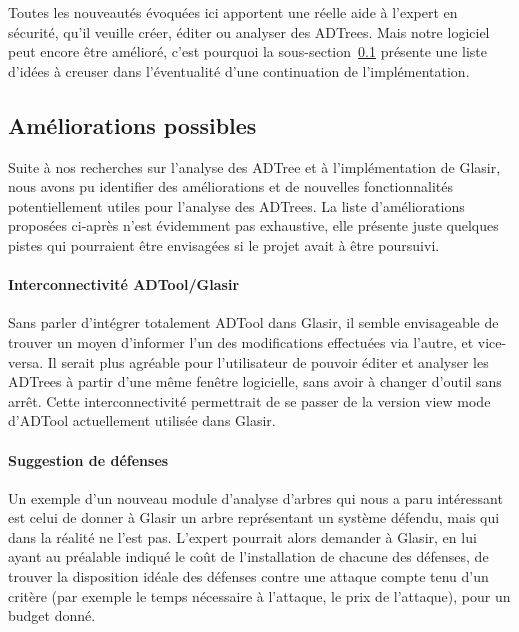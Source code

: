 Toutes les nouveautés évoquées ici apportent une réelle aide à l'expert en sécurité, qu'il veuille créer, éditer ou analyser des ADTrees. Mais notre logiciel peut encore être amélioré, c'est pourquoi la {\sc sous-section}~\ref{subsec:encorePlusMieux} présente une liste d'idées à creuser dans l'éventualité d'une continuation de l'implémentation.

\subsection{Améliorations possibles}
\label{subsec:encorePlusMieux}

Suite à nos recherches sur l'analyse des ADTree et à l'implémentation de Glasir, nous avons pu identifier des améliorations et de nouvelles fonctionnalités potentiellement utiles pour l'analyse des ADTrees. La liste d'améliorations proposées ci-après n'est évidemment pas exhaustive, elle présente juste quelques pistes qui pourraient être envisagées si le projet avait à être poursuivi.

\paragraph{Interconnectivité ADTool/Glasir} Sans parler d'intégrer totalement ADTool dans Glasir, il semble envisageable de trouver un moyen d'informer l'un des modifications effectuées via l'autre, et vice-versa. Il serait plus agréable pour l'utilisateur de pouvoir éditer et analyser les ADTrees à partir d'une même fenêtre logicielle, sans avoir à changer d'outil sans arrêt. Cette interconnectivité permettrait de se passer de la version \og view mode \fg{} d'ADTool actuellement utilisée dans Glasir. 

\paragraph{Suggestion de défenses} Un exemple d'un nouveau module d'analyse d'arbres qui nous a paru intéressant est celui de donner à Glasir un arbre représentant un système défendu, mais qui dans la réalité ne l'est pas. L'expert pourrait alors demander à Glasir, en lui ayant au préalable indiqué le coût de l'installation de chacune des défenses, de trouver la disposition idéale des défenses contre une attaque compte tenu d'un critère (par exemple le temps nécessaire à l'attaque, le prix de l'attaque), pour un budget donné.